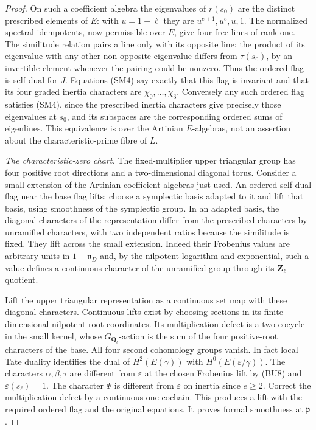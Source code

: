 \begin{proof}
On such a coefficient algebra the eigenvalues of \(r(s_0)\)
are the distinct prescribed elements of \(E\):
with \(u=1+\ell\) they are \(u^{e+1},u^e,u,1\).
The normalized spectral idempotents, now permissible over
\(E\), give four free lines of rank one. The similitude
relation pairs a line only with its opposite line:
the product of its eigenvalue with any other non-opposite
eigenvalue differs from \(\tau(s_0)\), by an invertible
element whenever the pairing could be nonzero.
Thus the ordered flag is self-dual for \(J\).
Equations (SM4) say exactly that this flag is invariant
and that its four graded inertia characters are
\(\chi_0,\ldots,\chi_3\). Conversely any such ordered flag
satisfies (SM4), since the prescribed inertia characters
give precisely those eigenvalues at \(s_0\), and its
subspaces are the corresponding ordered sums of eigenlines.
This equivalence is over the Artinian \(E\)-algebras, not
an assertion about the characteristic-prime fibre of \(L\).

\emph{The characteristic-zero chart.}
The fixed-multiplier upper triangular group has four positive
root directions and a two-dimensional diagonal torus.
Consider a small extension of the Artinian coefficient
algebras just used. An ordered self-dual flag near the
base flag lifts: choose a symplectic basis adapted to it
and lift that basis, using smoothness of the symplectic
group. In an adapted basis, the diagonal characters
of the representation differ from the prescribed characters
by unramified characters, with two independent ratios
because the similitude is fixed. They lift across the
small extension. Indeed their Frobenius values are arbitrary
units in \(1+\mathfrak n_D\) and, by the nilpotent logarithm
and exponential, such a value defines a continuous character
of the unramified group through its \(\mathbf Z_\ell\) quotient.

Lift the upper triangular representation as a continuous
set map with these diagonal characters. Continuous lifts
exist by choosing sections in its finite-dimensional
nilpotent root coordinates. Its multiplication defect
is a two-cocycle in the small kernel, whose \(G_{\mathbf
Q_\ell}\)-action is the sum of the four positive-root
characters of the base. All four second cohomology groups
vanish. In fact local Tate duality identifies the dual
of \(H^2(E(\gamma))\) with \(H^0(E(\varepsilon/\gamma))\).
The characters \(\alpha,\beta,\tau\) are different from
\(\varepsilon\) at the chosen Frobenius lift by (BU8)
and \(\varepsilon(s_\ell)=1\). The character \(\Psi\)
is different from \(\varepsilon\) on inertia since \(e\ge2\).
Correct the multiplication defect by a continuous
one-cochain. This produces a lift with the required
ordered flag and the original equations. It proves formal
smoothness at \(\mathfrak p\).


\end{proof}
